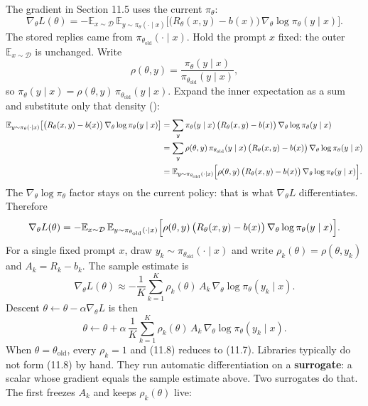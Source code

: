 The gradient in Section 11.5 uses the current $\pi_\theta$: \[
\nabla_\theta L(\theta)
=
-
\mathbb{E}_{x\sim\mathcal{D}}\,
\mathbb{E}_{y\sim\pi_\theta(\cdot\mid x)}
\bigl[
\bigl(R_\theta(x,y)-b(x)\bigr)\,
\nabla_\theta\log\pi_\theta(y\mid x)
\bigr].
\] The stored replies came from $\pi_{\theta_{\mathrm{old}}}(\cdot\mid x)$. Hold the prompt $x$ fixed: the outer $\mathbb{E}_{x\sim\mathcal{D}}$ is unchanged. Write \[
\rho(\theta,y)
=
\frac{\pi_\theta(y\mid x)}{\pi_{\theta_{\mathrm{old}}}(y\mid x)},
\] so $\pi_\theta(y\mid x)=\rho(\theta,y)\,\pi_{\theta_{\mathrm{old}}}(y\mid x)$. Expand the inner expectation as a sum and substitute only that density (): \[
\begin{aligned}
\mathbb{E}_{y\sim\pi_\theta(\cdot\mid x)}
\bigl[
\bigl(R_\theta(x,y)-b(x)\bigr)\,
\nabla_\theta\log\pi_\theta(y\mid x)
\bigr]
&=
\sum_y
\pi_\theta(y\mid x)\,
\bigl(R_\theta(x,y)-b(x)\bigr)\,
\nabla_\theta\log\pi_\theta(y\mid x)
\\
&=
\sum_y
\rho(\theta,y)\,
\pi_{\theta_{\mathrm{old}}}(y\mid x)\,
\bigl(R_\theta(x,y)-b(x)\bigr)\,
\nabla_\theta\log\pi_\theta(y\mid x)
\\
&=
\mathbb{E}_{y\sim\pi_{\theta_{\mathrm{old}}}(\cdot\mid x)}
\Bigl[
\rho(\theta,y)\,
\bigl(R_\theta(x,y)-b(x)\bigr)\,
\nabla_\theta\log\pi_\theta(y\mid x)
\Bigr].
\end{aligned}
\] The $\nabla_\theta\log\pi_\theta$ factor stays on the current policy: that is what $\nabla_\theta L$ differentiates. Therefore \[
\nabla_\theta L(\theta)
=
-
\mathbb{E}_{x\sim\mathcal{D}}\,
\mathbb{E}_{y\sim\pi_{\theta_{\mathrm{old}}}(\cdot\mid x)}
\Bigl[
\rho(\theta,y)\,
\bigl(R_\theta(x,y)-b(x)\bigr)\,
\nabla_\theta\log\pi_\theta(y\mid x)
\Bigr].
\] For a single fixed prompt $x$, draw $y_k\sim\pi_{\theta_{\mathrm{old}}}(\cdot\mid x)$ and write $\rho_k(\theta)=\rho(\theta,y_k)$ and $A_k=R_k-b_k$. The sample estimate is \[
\nabla_\theta L(\theta)
\approx
-\frac{1}{K}\sum_{k=1}^{K}
\rho_k(\theta)\,A_k\,
\nabla_\theta\log\pi_\theta(y_k\mid x).
\] Descent $\theta\leftarrow\theta-\alpha\nabla_\theta L$ is then \begin{equation}
\theta
\leftarrow
\theta
+
\alpha\,
\frac{1}{K}\sum_{k=1}^{K}
\rho_k(\theta)\,A_k\,
\nabla_\theta\log\pi_\theta(y_k\mid x).
\tag{11.8}
\end{equation} When $\theta=\theta_{\mathrm{old}}$, every $\rho_k=1$ and (11.8) reduces to (11.7). Libraries typically do not form (11.8) by hand. They run automatic differentiation on a \textbf{surrogate}: a scalar whose gradient equals the sample estimate above. Two surrogates do that. The first freezes $A_k$ and keeps $\rho_k(\theta)$ live: \[
\]
